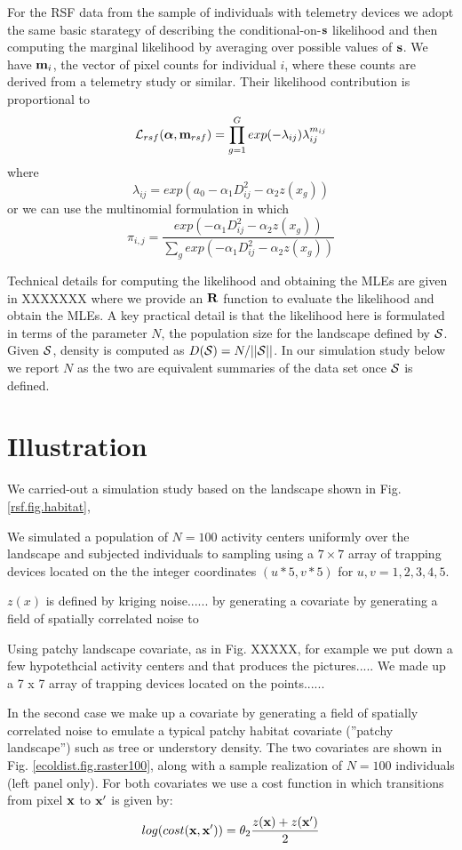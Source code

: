 For the RSF data from the sample of individuals with telemetry devices
we adopt the same basic starategy of describing the
conditional-on-${\bf s}$ likelihood and then computing the marginal
likelihood by averaging over possible values of ${\bf s}$.
We have ${\bf m}_{i}$, the vector of pixel counts for individual $i$,
where these counts are derived from a telemetry study or similar.
Their likelihood contribution is
proportional to
\[
 {\cal L}_{rsf}({\bm \alpha}, {\bf m}_{rsf})
 = \prod_{g=1}^{G}  exp(-\lambda_{ij}) \lambda_{ij}^{m_{ij}}
\]
where
\[
 \lambda_{ij} =  exp(a_{0}  -\alpha_{1} D_{ij}^{2} -\alpha_{2} z(x_{g}) )
\]
or we can use the multinomial formulation in which
\[
 \pi_{i,j} = \frac{ exp( -\alpha_{1} D_{ij}^{2} -\alpha_{2} z(x_{g}) ) }
{ \sum_{g} exp(-\alpha_{1} D_{ij}^{2} -\alpha_{2} z(x_{g}))}
\]


Technical details for computing the likelihood and obtaining the MLEs
are given in XXXXXXX where we provide an ${\bf R}$ function to
evaluate the likelihood and obtain the MLEs.  A key practical detail
is that the likelihood here is formulated in terms of the parameter
$N$, the population size for the landscape defined by ${\cal
  S}$. Given ${\cal S}$, density is computed as $D({\cal S}) =
N/||{\cal S}||$. In our simulation study below we report $N$ as the
two are equivalent summaries of the data set once ${\cal S}$ is
defined.


\section{Illustration}


We carried-out a simulation study based on the landscape
shown in  Fig. \ref{rsf.fig.habitat},

We simulated a population of $N=100$ activity centers uniformly over
the landscape and subjected individuals to sampling using 
a $7 \times 7$ array of trapping devices located on the 
the integer coordinates 
$(u*5,v*5)$ for $u,v = 1,2,3,4,5$.

 $z(x)$ is defined by kriging noise......
by generating a covariate by generating a field of spatially correlated noise to

Using patchy landscape covariate, as in Fig. XXXXX, for example we put
down a few hypotethcial activity centers and that produces the pictures.....
We made up a 7 x 7 array of trapping devices located on the points......


 In the second case we make up
a covariate by generating a field of spatially correlated noise to
emulate a typical patchy habitat covariate (''patchy landscape'') such as
tree or understory density. The two covariates are shown in
Fig. \ref{ecoldist.fig.raster100}, along with a sample realization of
$N=100$ individuals (left panel only).  For both covariates we use a
cost function in which transitions from pixel ${\bf x}$ to ${\bf x}'$
is given by:
\[
 log(cost({\bf x},{\bf x}'))=  \theta_2 \frac{z({\bf x}) + z({\bf x}')}{2}
\]

